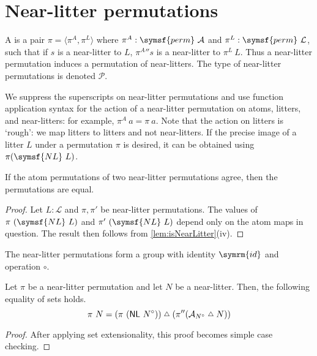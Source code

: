 \section{Near-litter permutations}

\begin{definition}
    A  is a pair \( \pi = \langle \pi^A, \pi^L \rangle \) where \( \pi^A : \symsf{perm}\ \mathcal A \) and \( \pi^L : \symsf{perm}\ \mathcal L \), such that if \( s \) is a near-litter to \( L \), \( {\pi^A} '' s \) is a near-litter to \( \pi^L\ L \).
    Thus a near-litter permutation induces a permutation of near-litters.
    The type of near-litter permutations is denoted \( \mathcal P \).
\end{definition}
We suppress the superscripts on near-litter permutations and use function application syntax for the action of a near-litter permutation on atoms, litters, and near-litters: for example, \( \pi^A\ a = \pi\ a \).
Note that the action on litters is `rough': we map litters to litters and not near-litters.
If the precise image of a litter \( L \) under a permutation \( \pi \) is desired, it can be obtained using \( \pi(\symsf{NL}\ L) \).
\begin{lemma}
    \label{lem:NearLitterPerm.atomPerm_injective}
    If the atom permutations of two near-litter permutations agree, then the permutations are equal.
\end{lemma}
\begin{proof}
    Let \( L : \mathcal L \) and \( \pi, \pi' \) be near-litter permutations.
    The values of \( \pi\ (\symsf{NL}\ L) \) and \( \pi'\ (\symsf{NL}\ L) \) depend only on the atom maps in question.
    The result then follows from \cref{lem:isNearLitter}(iv).
\end{proof}
\begin{lemma}
    The near-litter permutations form a group with identity \( \symrm{id} \) and operation \( \circ \).
\end{lemma}
\begin{lemma}
    \label{lem:smul_nearLitter_eq_smul_symmDiff_smul}
    Let \( \pi \) be a near-litter permutation and let \( N \) be a near-litter.
    Then, the following equality of sets holds.
    \[ \pi\ N = (\pi\ (\mathsf{NL}\ N^\circ)) \symmdiff (\pi '' (\mathcal A_{N^\circ} \symmdiff N)) \]
\end{lemma}
\begin{proof}
    After applying set extensionality, this proof becomes simple case checking.
\end{proof}
